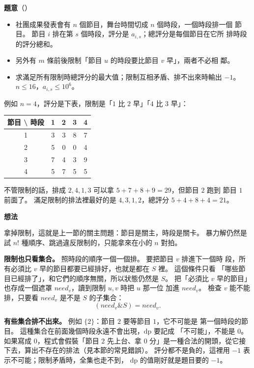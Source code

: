 \textbf{題意}（）

\begin{itemize}
\item 社團成果發表會有 $n$ 個節目，舞台時間切成 $n$ 個時段，一個時段排一個
節目。 節目 $i$ 排在第 $s$ 個時段，評分是 $a_{i,s}$；總評分是每個節目在它所
排時段的評分總和。
\item 另外有 $m$ 條前後限制「節目 $u$ 的時段要比節目 $v$ 早」，兩者不必相
鄰。
\item 求滿足所有限制時總評分的最大值；限制互相矛盾、排不出來時輸出 $-1$。
$n \le 16$，$a_{i,s} \le 10^6$。
\end{itemize}

例如 $n = 4$，評分是下表，限制是「$1$ 比 $2$ 早」「$4$ 比 $3$ 早」：

\begin{center}
\begin{tabular}{c|cccc}
\toprule
節目 \textbackslash{} 時段 & 1 & 2 & 3 & 4 \\
\midrule
1 & 3 & 3 & 8 & 7 \\
2 & 5 & 0 & 0 & 4 \\
3 & 7 & 4 & 3 & 9 \\
4 & 5 & 7 & 5 & 5 \\
\bottomrule
\end{tabular}
\end{center}

不管限制的話，排成 $2, 4, 1, 3$ 可以拿 $5 + 7 + 8 + 9 = 29$，但節目 $2$ 跑到
節目 $1$ 前面了。 滿足限制的排法裡最好的是 $4, 3, 1, 2$，總評分
$5 + 4 + 8 + 4 = 21$。

\textbf{想法}

拿掉限制，這就是上一節的關主問題：節目是關主，時段是關卡。 暴力解仍然是試
$n!$ 種順序、跳過違反限制的，只能拿來在小的 $n$ 對拍。

\textbf{限制也只看集合。} 照時段的順序一個一個排。 要把節目 $v$ 排進下一個時
段，所有必須比 $v$ 早的節目都要已經排好，也就是都在 $S$ 裡。 這個條件只看
「哪些節目已經排了」，和它們的順序無關，所以狀態仍然是 $S$。 把「必須比 $v$
早的節目」也存成一個遮罩 $\mathit{need}_v$，讀到限制 $u, v$ 時把 $u$ 那一位
加進 $\mathit{need}_v$。 檢查 $v$ 能不能排，只要看 $\mathit{need}_v$ 是不是
$S$ 的子集合：
\[
(\mathit{need}_v \mathbin{\&} S) = \mathit{need}_v .
\]

\textbf{有些集合排不出來。} 例如 $\{2\}$：節目 $2$ 要等節目 $1$，它不可能是
第一個時段的節目。 這種集合在前面幾個時段永遠不會出現，$\mathrm{dp}$ 要記成
「不可能」，不能是 $0$。 如果寫成 $0$，程式會假裝「節目 $2$ 先上台、拿 $0$
分」是一種合法的開頭，從它接下去，算出不存在的排法（見本節的常見錯誤）。
評分都不是負的，這裡用 $-1$ 表示不可能；限制矛盾時，全集也走不到，
$\mathrm{dp}$ 的值剛好就是題目要的 $-1$。

